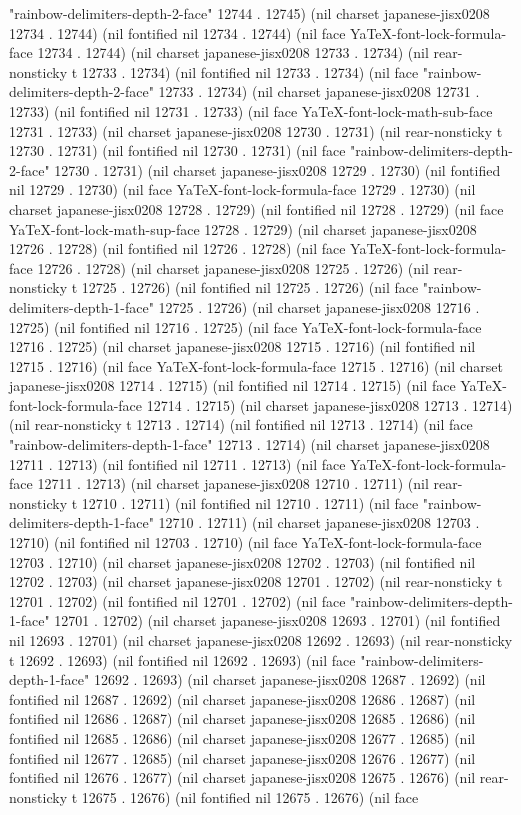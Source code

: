 "rainbow-delimiters-depth-2-face" 12744 . 12745) (nil charset japanese-jisx0208 12734 . 12744) (nil fontified nil 12734 . 12744) (nil face YaTeX-font-lock-formula-face 12734 . 12744) (nil charset japanese-jisx0208 12733 . 12734) (nil rear-nonsticky t 12733 . 12734) (nil fontified nil 12733 . 12734) (nil face "rainbow-delimiters-depth-2-face" 12733 . 12734) (nil charset japanese-jisx0208 12731 . 12733) (nil fontified nil 12731 . 12733) (nil face YaTeX-font-lock-math-sub-face 12731 . 12733) (nil charset japanese-jisx0208 12730 . 12731) (nil rear-nonsticky t 12730 . 12731) (nil fontified nil 12730 . 12731) (nil face "rainbow-delimiters-depth-2-face" 12730 . 12731) (nil charset japanese-jisx0208 12729 . 12730) (nil fontified nil 12729 . 12730) (nil face YaTeX-font-lock-formula-face 12729 . 12730) (nil charset japanese-jisx0208 12728 . 12729) (nil fontified nil 12728 . 12729) (nil face YaTeX-font-lock-math-sup-face 12728 . 12729) (nil charset japanese-jisx0208 12726 . 12728) (nil fontified nil 12726 . 12728) (nil face YaTeX-font-lock-formula-face 12726 . 12728) (nil charset japanese-jisx0208 12725 . 12726) (nil rear-nonsticky t 12725 . 12726) (nil fontified nil 12725 . 12726) (nil face "rainbow-delimiters-depth-1-face" 12725 . 12726) (nil charset japanese-jisx0208 12716 . 12725) (nil fontified nil 12716 . 12725) (nil face YaTeX-font-lock-formula-face 12716 . 12725) (nil charset japanese-jisx0208 12715 . 12716) (nil fontified nil 12715 . 12716) (nil face YaTeX-font-lock-formula-face 12715 . 12716) (nil charset japanese-jisx0208 12714 . 12715) (nil fontified nil 12714 . 12715) (nil face YaTeX-font-lock-formula-face 12714 . 12715) (nil charset japanese-jisx0208 12713 . 12714) (nil rear-nonsticky t 12713 . 12714) (nil fontified nil 12713 . 12714) (nil face "rainbow-delimiters-depth-1-face" 12713 . 12714) (nil charset japanese-jisx0208 12711 . 12713) (nil fontified nil 12711 . 12713) (nil face YaTeX-font-lock-formula-face 12711 . 12713) (nil charset japanese-jisx0208 12710 . 12711) (nil rear-nonsticky t 12710 . 12711) (nil fontified nil 12710 . 12711) (nil face "rainbow-delimiters-depth-1-face" 12710 . 12711) (nil charset japanese-jisx0208 12703 . 12710) (nil fontified nil 12703 . 12710) (nil face YaTeX-font-lock-formula-face 12703 . 12710) (nil charset japanese-jisx0208 12702 . 12703) (nil fontified nil 12702 . 12703) (nil charset japanese-jisx0208 12701 . 12702) (nil rear-nonsticky t 12701 . 12702) (nil fontified nil 12701 . 12702) (nil face "rainbow-delimiters-depth-1-face" 12701 . 12702) (nil charset japanese-jisx0208 12693 . 12701) (nil fontified nil 12693 . 12701) (nil charset japanese-jisx0208 12692 . 12693) (nil rear-nonsticky t 12692 . 12693) (nil fontified nil 12692 . 12693) (nil face "rainbow-delimiters-depth-1-face" 12692 . 12693) (nil charset japanese-jisx0208 12687 . 12692) (nil fontified nil 12687 . 12692) (nil charset japanese-jisx0208 12686 . 12687) (nil fontified nil 12686 . 12687) (nil charset japanese-jisx0208 12685 . 12686) (nil fontified nil 12685 . 12686) (nil charset japanese-jisx0208 12677 . 12685) (nil fontified nil 12677 . 12685) (nil charset japanese-jisx0208 12676 . 12677) (nil fontified nil 12676 . 12677) (nil charset japanese-jisx0208 12675 . 12676) (nil rear-nonsticky t 12675 . 12676) (nil fontified nil 12675 . 12676) (nil face 